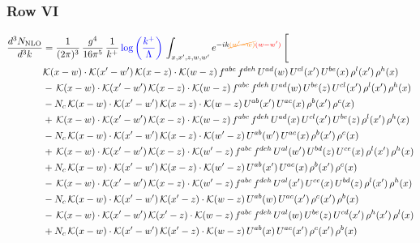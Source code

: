 \documentclass[9pt]{article}
\numberwithin{equation}{section}
\begin{document}
\subsubsection{Row VI}
\begin{align}
\frac{d^{3}N_{\mathrm{NLO}}}{d^{3}k} & = \frac{1}{(2\pi)^{3}}\,\frac{g^{4}}{16\pi^{5}}\,\frac{1}{k^{+}}\,{\color{blue}\log{\left(\frac{k^{+}}{\Lambda}\right)}}\,\int_{x,x',z,w,w'}e^{-ik{\color{orange}\cancel{(w'-w)}}{\color{red}(w-w')}}\,\Bigg[\notag\\ & \mathcal{K}(x-w)\cdot\mathcal{K}(x'-w')\,\mathcal{K}(x-z)\cdot\mathcal{K}(w-z)\,f^{abc}\,f^{deh}\,U^{ad}(w)\,U^{cl}(x')\,U^{be}(x)\,\rho^{l}(x')\,\rho^{h}(x)\notag\\
& -\,\mathcal{K}(x-w)\cdot\mathcal{K}(x'-w')\,\mathcal{K}(x-z)\cdot\mathcal{K}(w-z)\,f^{abc}\,f^{deh}\,U^{ad}(w)\,U^{be}(z)\,U^{cl}(x')\,\rho^{l}(x')\,\rho^{h}(x)\notag\\
& -N_{c}\,\mathcal{K}(x-w)\cdot\mathcal{K}(x'-w')\,\mathcal{K}(x-z)\cdot\mathcal{K}(w-z)\,U^{ab}(x')\,U^{ac}(x)\,\rho^{b}(x')\,\rho^{c}(x)\notag\\
& +\,\mathcal{K}(x-w)\cdot\mathcal{K}(x'-w')\,\mathcal{K}(x-z)\cdot\mathcal{K}(w-z)\,f^{abc}\,f^{deh}\,U^{ad}(x)\,U^{cl}(x')\,U^{be}(z)\,\rho^{l}(x')\,\rho^{h}(x)\notag\\
& -N_{c}\,\mathcal{K}(x-w)\cdot\mathcal{K}(x'-w')\,\mathcal{K}(x-z)\cdot\mathcal{K}(w'-z)\,U^{ab}(w')\,U^{ac}(x)\,\rho^{b}(x')\,\rho^{c}(x)\notag\\
& +\,\mathcal{K}(x-w)\cdot\mathcal{K}(x'-w')\,\mathcal{K}(x-z)\cdot\mathcal{K}(w'-z)\,f^{abc}\,f^{deh}\,U^{al}(w')\,U^{bd}(z)\,U^{ce}(x)\,\rho^{l}(x')\,\rho^{h}(x)\notag\\
& +N_{c}\,\mathcal{K}(x-w)\cdot\mathcal{K}(x'-w')\,\mathcal{K}(x-z)\cdot\mathcal{K}(w'-z)\,U^{ab}(x')\,U^{ac}(x)\,\rho^{b}(x')\,\rho^{c}(x)\notag\\
& -\,\mathcal{K}(x-w)\cdot\mathcal{K}(x'-w')\,\mathcal{K}(x-z)\cdot\mathcal{K}(w'-z)\,f^{abc}\,f^{deh}\,U^{al}(x')\,U^{ce}(x)\,U^{bd}(z)\,\rho^{l}(x')\,\rho^{h}(x)\notag\\
& -N_{c}\,\mathcal{K}(x-w)\cdot\mathcal{K}(x'-w')\,\mathcal{K}(x'-z)\cdot\mathcal{K}(w-z)\,U^{ab}(w)\,U^{ac}(x')\,\rho^{c}(x')\,\rho^{b}(x)\notag\\
& -\,\mathcal{K}(x-w)\cdot\mathcal{K}(x'-w')\,\mathcal{K}(x'-z)\cdot\mathcal{K}(w-z)\,f^{abc}\,f^{deh}\,U^{al}(w)\,U^{be}(z)\,U^{cd}(x')\,\rho^{h}(x')\,\rho^{l}(x)\notag\\
& +N_{c}\,\mathcal{K}(x-w)\cdot\mathcal{K}(x'-w')\,\mathcal{K}(x'-z)\cdot\mathcal{K}(w-z)\,U^{ab}(x)\,U^{ac}(x')\,\rho^{c}(x')\,\rho^{b}(x)\notag\\

\end{align}
\end{document}
